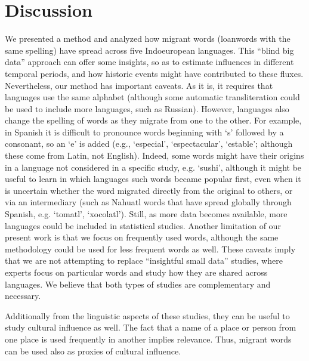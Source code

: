 \documentclass[10pt,letterpaper]{article} %
\begin{document}


\section*{Discussion} %

We presented a method and analyzed how migrant words (loanwords with the same spelling) have spread across five Indoeuropean languages. This ``blind big data'' approach can offer some insights, so as to estimate influences in different temporal periods, and how historic events might have contributed to these fluxes. Nevertheless, our method has important caveats. As it is, it requires that languages use the same alphabet (although some automatic transliteration could be used to include more languages, such as Russian). However, languages also change the spelling of words as they migrate from one to the other. For example, in Spanish it is difficult to pronounce words beginning with `s' followed by a consonant, so an `e' is added (e.g., `especial', `espectacular', `estable'; although these come from Latin, not English). Indeed, some words might have their origins in a language not considered in a specific study, e.g. `sushi', although it might be useful to learn in which languages such words became popular first, even when it is uncertain whether the word migrated directly from the original to others, or via an intermediary (such as Nahuatl words that have spread globally through Spanish, e.g. `tomatl', `xocolatl'). Still, as more data becomes available, more languages could be included in statistical studies. Another limitation of our present work is that we focus on frequently used words, although the same methodology could be used for less frequent words as well. These caveats imply that we are not attempting to replace ``insightful small data'' studies, where experts focus on particular words and study how they are shared across languages. We believe that both types of studies are complementary and necessary.

Additionally from the linguistic aspects of these studies, they can be useful to study cultural influence as well. The fact that a name of a place or person from one place is used frequently in another implies relevance. Thus, migrant words can be used also as proxies of cultural influence.
\end{document}
